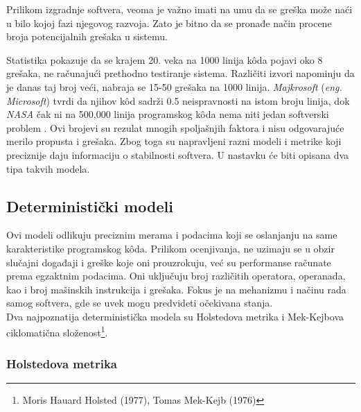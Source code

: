 \documentclass[a4paper]{article}
\begin{document}
Prilikom izgradnje softvera, veoma je važno imati na umu da se greška može naći u bilo kojoj fazi njegovog razvoja. Zato je bitno da se pronađe način procene broja potencijalnih grešaka u sistemu.

Statistika pokazuje da se krajem 20. veka na 1000 linija k\^{o}da pojavi oko 8 grešaka, ne računajući prethodno testiranje sistema. Različiti izvori napominju da je danas taj broj veći, nabraja se 15-50 grešaka na 1000 linija. \emph{Majkrosoft} (\emph{eng. Microsoft}) tvrdi da njihov k\^{o}d sadrži 0.5 neispravnosti na istom broju linija, dok \emph{NASA} čak ni na 500,000 linija programskog k\^{o}da nema niti jedan softverski problem \cite{Statistika_prosek_gresaka}. Ovi brojevi su rezulat mnogih spoljašnjih faktora i nisu odgovarajuće merilo propusta i grešaka. Zbog toga su napravljeni razni modeli i metrike koji preciznije daju informaciju o stabilnosti softvera. U nastavku će biti opisana dva tipa takvih modela.

\subsection{Deterministički modeli}
\label{sec:deterministicki}

Ovi modeli odlikuju preciznim merama i podacima koji se oslanjanju na same karakteristike programskog k\^{o}da. Prilikom ocenjivanja, ne uzimaju se u obzir slučajni događaji i greške koje oni prouzrokuju, već su performanse računate prema egzaktnim podacima. Oni uključuju broj različitih operatora, operanada, kao i broj mašinskih instrukcija i grešaka. Fokus je na mehanizmu i načinu rada samog softvera, gde se uvek mogu predvideti očekivana stanja.\\
Dva najpoznatija deterministička modela su Holstedova metrika i Mek-Kejbova ciklomatična složenost\footnote{ Moris Hauard Holsted (1977), Tomas Mek-Kejb (1976)}.

\subsubsection{Holstedova metrika}
\label{subsec:holsted}
\end{document}
